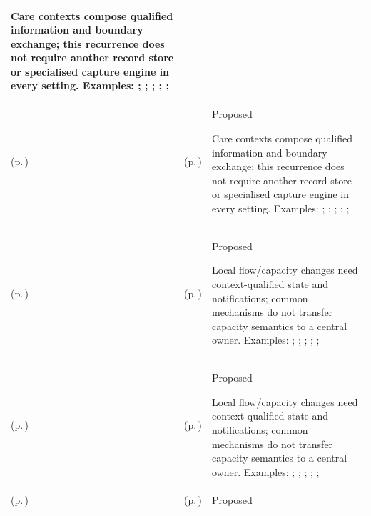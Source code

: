 \begin{longtable}{|>{\raggedright\arraybackslash}p{0.27\TableWidth}|>{\raggedright\arraybackslash}p{0.27\TableWidth}|>{\raggedright\arraybackslash}p{0.46\TableWidth}|}
Care contexts compose qualified information and boundary exchange; this recurrence does not require another record store or specialised capture engine in every setting. Examples: \nameref{feature:feat-sd-11}; \nameref{feature:feat-sd-12}; \nameref{function:project-longitudinal-medication-history}; \nameref{service:longitudinal-medication-history-query}; \nameref{function:correlate-adverse-reaction-allergy-profile}; \nameref{service:allergy-adverse-reaction-query}\\\hline
\nameref{cap:bec-medication-therapy} (p.\,\pageref{cap:bec-medication-therapy}) & \nameref{cap:ec-08} (p.\,\pageref{cap:ec-08}) & Proposed

Care contexts compose qualified information and boundary exchange; this recurrence does not require another record store or specialised capture engine in every setting. Examples: \nameref{feature:feat-sd-11}; \nameref{feature:feat-sd-12}; \nameref{function:project-longitudinal-medication-history}; \nameref{service:longitudinal-medication-history-query}; \nameref{function:correlate-adverse-reaction-allergy-profile}; \nameref{service:allergy-adverse-reaction-query}\\\hline
\nameref{cap:bec-clinic-practice-operations} (p.\,\pageref{cap:bec-clinic-practice-operations}) & \nameref{cap:ec-02} (p.\,\pageref{cap:ec-02}) & Proposed

Local flow/capacity changes need context-qualified state and notifications; common mechanisms do not transfer capacity semantics to a central owner. Examples: \nameref{feature:feat-hso-01}; \nameref{feature:feat-hso-02}; \nameref{function:manage-clinic-practice-capacity}; \nameref{function:track-clinic-operating-session}; \nameref{function:manage-clinic-queue-progression}; \nameref{service:clinic-queue-telemetry-service}\\\hline
\nameref{cap:bec-clinic-practice-operations} (p.\,\pageref{cap:bec-clinic-practice-operations}) & \nameref{cap:ec-03} (p.\,\pageref{cap:ec-03}) & Proposed

Local flow/capacity changes need context-qualified state and notifications; common mechanisms do not transfer capacity semantics to a central owner. Examples: \nameref{feature:feat-hso-01}; \nameref{feature:feat-hso-02}; \nameref{function:manage-clinic-practice-capacity}; \nameref{function:track-clinic-operating-session}; \nameref{function:manage-clinic-queue-progression}; \nameref{service:clinic-queue-telemetry-service}\\\hline
\nameref{cap:bec-clinic-practice-operations} (p.\,\pageref{cap:bec-clinic-practice-operations}) & \nameref{cap:ec-09} (p.\,\pageref{cap:ec-09}) & Proposed


\end{longtable}
